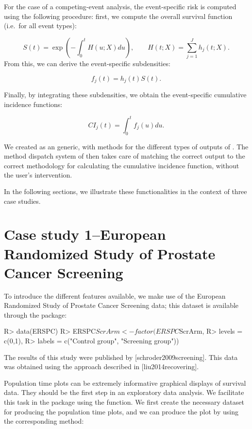\documentclass[
]{jss}
\begin{document}
For the case of a competing-event analysis, the event-specific risk is
computed using the following procedure: first, we compute the overall
survival function (i.e.~for all event types):

\[ S(t) = \exp\left(-\int_0^t H(u;X) du\right),\qquad H(t;X) = \sum_{j=1}^J h_j(t;X).\]
From this, we can derive the event-specific subdensities:

\[ f_j(t) = h_j(t)S(t).\]

Finally, by integrating these subdensities, we obtain the event-specific
cumulative incidence functions:

\[ CI_j(t) = \int_0^t f_j(u)du.\]

We created  as an  generic, with methods for
the different types of outputs of . The method
dispatch system of  then takes care of matching the correct
output to the correct methodology for calculating the cumulative
incidence function, without the user's intervention.

In the following sections, we illustrate these functionalities in the
context of three case studies.

\hypertarget{case-study-1european-randomized-study-of-prostate-cancer-screening}{%
\section{Case study 1--European Randomized Study of Prostate Cancer
Screening}\label{case-study-1european-randomized-study-of-prostate-cancer-screening}}

To introduce the different features available, we make use of the
European Randomized Study of Prostate Cancer Screening data; this
dataset is available through the  package:

\begin{CodeChunk}

\begin{CodeInput}
R> data(ERSPC)
R> ERSPC$ScrArm <- factor(ERSPC$ScrArm, 
R>                        levels = c(0,1), 
R>                        labels = c("Control group", "Screening group"))
\end{CodeInput}
\end{CodeChunk}

The results of this study were published by {[}schroder2009screening{]}.
This data was obtained using the approach described in
{[}liu2014recovering{]}.

Population time plots can be extremely informative graphical displays of
survival data. They should be the first step in an exploratory data
analysis. We facilitate this task in the  package using
the  function. We first create the necessary dataset for
producing the population time plots, and we can produce the plot by
using the corresponding  method:
\end{document}
